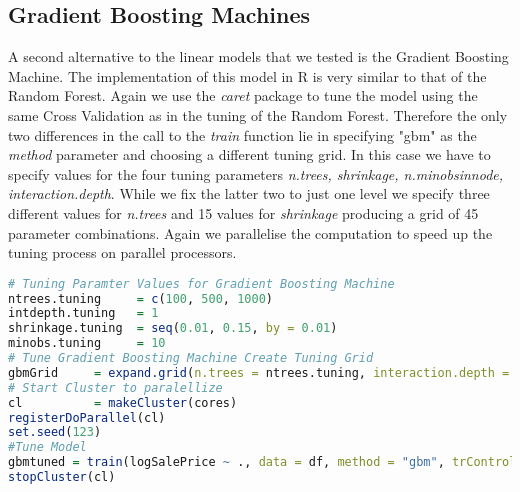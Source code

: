 \subsection{Gradient Boosting Machines}
A second alternative to the linear models that we tested is the Gradient Boosting Machine. The implementation of this model in R is very similar to that of the Random Forest. Again we use the \textit{caret} package to tune the model using the same Cross Validation as in the tuning of the Random Forest. Therefore the only two differences in the call to the \textit{train} function lie in specifying "gbm" as the \textit{method} parameter and choosing a different tuning grid. In this case we have to specify values for the four tuning parameters \textit{n.trees, shrinkage, n.minobsinnode, interaction.depth}. While we fix the latter two to just one level we specify three different values for \textit{n.trees} and 15 values for \textit{shrinkage} producing a grid of 45 parameter combinations.
Again we parallelise the computation to speed up the tuning process on parallel processors.

\begin{lstlisting}[language=R]
# Tuning Paramter Values for Gradient Boosting Machine
ntrees.tuning     = c(100, 500, 1000)
intdepth.tuning   = 1
shrinkage.tuning  = seq(0.01, 0.15, by = 0.01)
minobs.tuning     = 10
# Tune Gradient Boosting Machine Create Tuning Grid
gbmGrid     = expand.grid(n.trees = ntrees.tuning, interaction.depth = intdepth.tuning, shrinkage = shrinkage.tuning, n.minobsinnode = minobs.tuning)
# Start Cluster to paralellize
cl          = makeCluster(cores)
registerDoParallel(cl)
set.seed(123)
#Tune Model
gbmtuned = train(logSalePrice ~ ., data = df, method = "gbm", trControl = CrossValidation, verbose = TRUE, tuneGrid = gbmGrid)
stopCluster(cl)
\end{lstlisting}